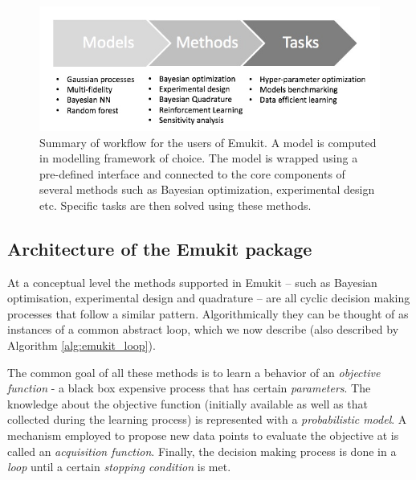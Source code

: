 \begin{figure}[h]
    \centering
      \includegraphics[scale=0.4]{workflow.png}  
    \caption{Summary of workflow for the users of Emukit. A model is computed in modelling framework of choice. The model is wrapped using a pre-defined interface and connected to the core components of several methods such as Bayesian optimization, experimental design etc. Specific tasks are then solved using these methods.}
    \label{figure:workflow}
\end{figure}

\subsection{Architecture of the Emukit package}

At a conceptual level the methods supported in Emukit -- such as Bayesian optimisation, experimental design and quadrature -- are all cyclic decision making processes that follow a similar pattern. 
Algorithmically they can be thought of as instances of a common abstract loop, which we now describe (also described by Algorithm \ref{alg:emukit_loop}).

The common goal of all these methods is to learn a behavior of an \textit{objective function} - a black box expensive process that has certain \textit{parameters}. The knowledge about the objective function (initially available as well as that collected during the learning process) is represented with a \textit{probabilistic model}. A mechanism employed to propose new data points to evaluate the objective at is called an \textit{acquisition function}. Finally, the decision making process is done in a \textit{loop} until a certain \textit{stopping condition} is met. 

